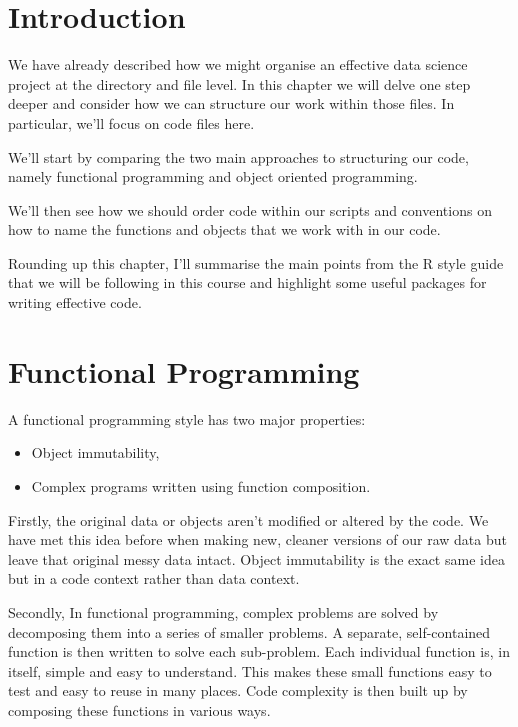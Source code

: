 \documentclass[
  12pt,
]{book}
\begin{document}
\hypertarget{introduction-1}{%
\section{Introduction}\label{introduction-1}}

We have already described how we might organise an effective data science project at the directory and file level. In this chapter we will delve one step deeper and consider how we can structure our work within those files. In particular, we'll focus on code files here.

We'll start by comparing the two main approaches to structuring our code, namely functional programming and object oriented programming.

We'll then see how we should order code within our scripts and conventions on how to name the functions and objects that we work with in our code.

Rounding up this chapter, I'll summarise the main points from the R style guide that we will be following in this course and highlight some useful packages for writing effective code.

\hypertarget{functional-programming}{%
\section{Functional Programming}\label{functional-programming}}

A functional programming style has two major properties:

\begin{itemize}
\item
  Object immutability,
\item
  Complex programs written using function composition.
\end{itemize}

Firstly, the original data or objects aren't modified or altered by the code. We have met this idea before when making new, cleaner versions of our raw data but leave that original messy data intact. Object immutability is the exact same idea but in a code context rather than data context.

Secondly, In functional programming, complex problems are solved by decomposing them into a series of smaller problems. A separate, self-contained function is then written to solve each sub-problem. Each individual function is, in itself, simple and easy to understand. This makes these small functions easy to test and easy to reuse in many places. Code complexity is then built up by composing these functions in various ways.
\end{document}
